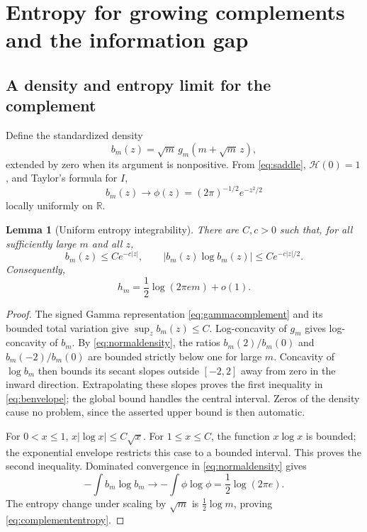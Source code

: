 \documentclass[11pt,a4paper]{article}
\numberwithin{equation}{section}
\newtheorem{lemma}[theorem]{Lemma}
\theoremstyle{definition}
\theoremstyle{remark}
\newcommand{\R}{\mathbb R}
\newcommand{\HH}{\mathcal H}
\begin{document}
\section{Entropy for growing complements and the information gap}
\label{sec:entropy}

\subsection{A density and entropy limit for the complement}
Define the standardized density
\begin{equation}\label{eq:bstandard}
b_m(z)=\sqrt m\,g_m(m+\sqrt m\,z),
\end{equation}
extended by zero when its argument is nonpositive. From
\eqref{eq:saddle}, $\HH(0)=1$, and Taylor's formula for $I$,
\begin{equation}\label{eq:normaldensity}
b_m(z)\longrightarrow\phi(z)=(2\pi)^{-1/2}e^{-z^2/2}
\end{equation}
locally uniformly on $\R$.

\begin{lemma}[Uniform entropy integrability]\label{lem:entui}
There are $C,c>0$ such that, for all sufficiently large $m$ and all $z$,
\begin{equation}\label{eq:benvelope}
b_m(z)\le Ce^{-c|z|},\qquad
|b_m(z)\log b_m(z)|\le Ce^{-c|z|/2}.
\end{equation}
Consequently,
\begin{equation}\label{eq:complemententropy}
h_m=\frac12\log(2\pi e m)+o(1).
\end{equation}
\end{lemma}
\begin{proof}
The signed Gamma representation \eqref{eq:gammacomplement} and its
bounded total variation give $\sup_z b_m(z)\le C$. Log-concavity of
$g_m$ gives log-concavity of $b_m$. By \eqref{eq:normaldensity}, the
ratios $b_m(2)/b_m(0)$ and $b_m(-2)/b_m(0)$ are bounded strictly below
one for large $m$. Concavity of $\log b_m$ then bounds its secant slopes
outside $[-2,2]$ away from zero in the inward direction. Extrapolating
these slopes proves the first inequality in \eqref{eq:benvelope}; the
global bound handles the central interval. Zeros of the density cause
no problem, since the asserted upper bound is then automatic.

For $0<x\le1$, $x|\log x|\le C\sqrt x$. For $1\le x\le C$, the
function $x\log x$ is bounded; the exponential envelope restricts this
case to a bounded interval. This proves the second inequality.
Dominated convergence in \eqref{eq:normaldensity} gives
\[
-\int b_m\log b_m\longrightarrow-\int\phi\log\phi
 =\frac12\log(2\pi e).
\]
The entropy change under scaling by $\sqrt m$ is $\tfrac12\log m$,
proving \eqref{eq:complemententropy}.
\end{proof}
\end{document}
